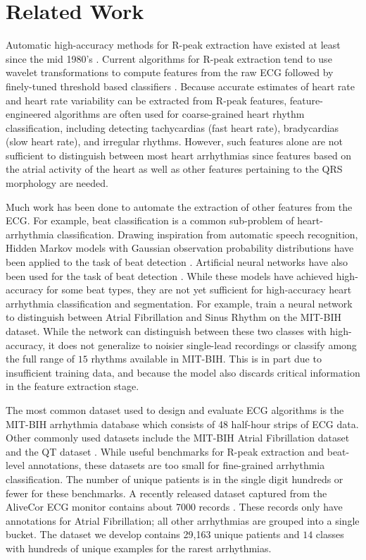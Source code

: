\section{Related Work}
\label{sec:arrhythmia:related}

Automatic high-accuracy methods for R-peak extraction have existed at least
since the mid 1980's \cite{pan1985real}. Current algorithms for R-peak
extraction tend to use wavelet transformations to compute features from the raw
ECG followed by finely-tuned threshold based classifiers \cite{li1995detection,
martinez2004wavelet}. Because accurate estimates of heart rate and heart rate
variability can be extracted from R-peak features, feature-engineered
algorithms are often used for coarse-grained heart rhythm classification,
including detecting tachycardias (fast heart rate), bradycardias (slow heart
rate), and irregular rhythms. However, such features alone are not sufficient
to distinguish between most heart arrhythmias since features based on the
atrial activity of the heart as well as other features pertaining to the QRS
morphology are needed.

Much work has been done to automate the extraction of other features from the
ECG. For example, beat classification is a common sub-problem of
heart-arrhythmia classification. Drawing inspiration from automatic speech
recognition, Hidden Markov models with Gaussian observation probability
distributions have been applied to the task of beat detection
\cite{coast1990approach}. Artificial neural networks have also been used for
the task of beat detection \cite{melo2000arrhythmia}. While these models have
achieved high-accuracy for some beat types, they are not yet sufficient for
high-accuracy heart arrhythmia classification and segmentation. For example,
\cite{artis1991detection} train a neural network to distinguish between Atrial
Fibrillation and Sinus Rhythm on the MIT-BIH dataset. While the network can
distinguish between these two classes with high-accuracy, it does not
generalize to noisier single-lead recordings or classify among the full range
of $15$ rhythms available in MIT-BIH. This is in part due to insufficient
training data, and because the model also discards critical information in the
feature extraction stage.

The most common dataset used to design and evaluate ECG algorithms is the
MIT-BIH arrhythmia database \cite{moody2001impact} which consists of 48
half-hour strips of ECG data. Other commonly used datasets include the MIT-BIH
Atrial Fibrillation dataset \cite{moody1983new} and the QT dataset
\cite{laguna1997database}. While useful benchmarks for R-peak extraction and
beat-level annotations, these datasets are too small for fine-grained
arrhythmia classification. The number of unique patients is in the single digit
hundreds or fewer for these benchmarks. A recently released dataset captured
from the AliveCor ECG monitor contains about 7000 records \cite{clifford2017}.
These records only have annotations for Atrial Fibrillation; all other
arrhythmias are grouped into a single bucket. The dataset we develop contains
29,163 unique patients and $14$ classes with hundreds of unique examples for
the rarest arrhythmias.

